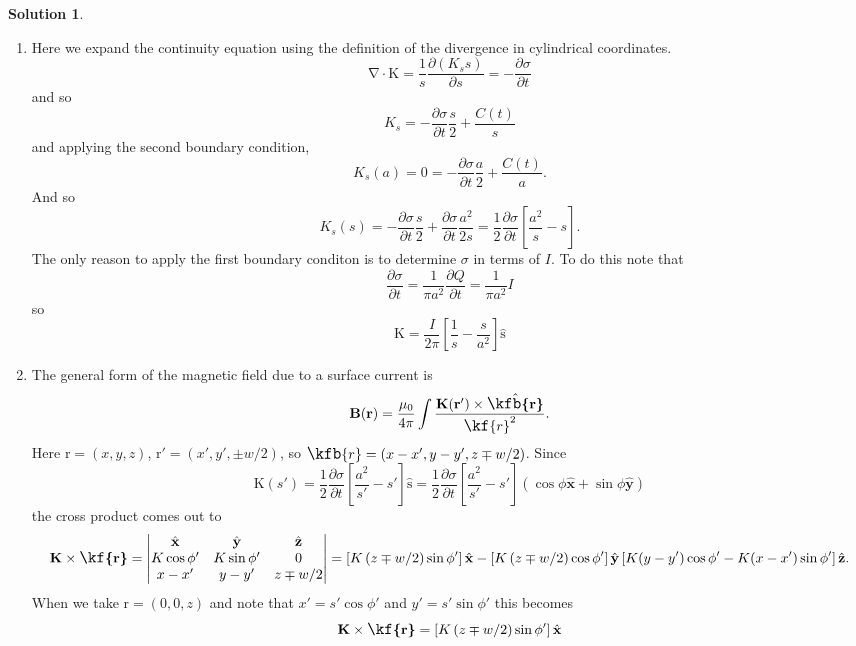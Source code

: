 \documentclass[10pt]{article}
\theoremstyle{definition}
\newtheorem{soln}{Solution}
\newcommand{\ux}{\hat{\mathbf{x}}}
\newcommand{\uy}{\hat{\mathbf{y}}}
\newcommand{\uz}{\hat{\mathbf{z}}}
\newcommand{\uv}[1]{\hat{\bv{{#1}}}}
\renewcommand{\div}[1]{\bv{\nabla}\cdot #1}
\newcommand{\scriptr}{\fontsize{12pt}{12pt}\kf{r}\fontsize{10pt}{10pt}}
\newcommand{\bscriptr}{\fontsize{12pt}{12pt}\kfb{r}\fontsize{10pt}{10pt}}
\newcommand{\bv}[1]{\bm{\mathrm{#1}}}
\begin{document}
\begin{soln}~
  \begin{enumerate}[label=(\alph*)]
    \item Here we expand the continuity equation using the definition of the divergence in cylindrical coordinates.
          $$\div{\bv{K}}=\frac{1}{s}\frac{\partial (K_ss)}{\partial s}=-\frac{\partial \sigma}{\partial t}$$
          and so
          $$K_s=-\frac{\partial \sigma}{\partial t}\frac{s}{2}+\frac{C(t)}{s}$$
          and applying the second boundary condition,
          $$K_s(a)=0=-\frac{\partial \sigma}{\partial t}\frac{a}{2}+\frac{C(t)}{a}.$$
          And so
          $$K_s(s)=-\frac{\partial \sigma}{\partial t}\frac{s}{2}+\frac{\partial \sigma}{\partial t}\frac{a^2}{2s}=\frac{1}{2}\frac{\partial \sigma}{\partial t}\left[\frac{a^2}{s}-s\right].$$
          The only reason to apply the first boundary conditon is to determine $\sigma$ in terms of $I$. To do this note that
          $$\frac{\partial \sigma}{\partial t}=\frac{1}{\pi a^2}\frac{\partial Q}{\partial t}=\frac{1}{\pi a^2}I$$
          so
          $$\bv{K}=\frac{I}{2\pi}\left[\frac{1}{s}-\frac{s}{a^2}\right]\uv{s}$$
    \item The general form of the magnetic field due to a surface current is
          $$\bv{B}(\bv{r})=\frac{\mu_0}{4\pi}\int \frac{\bv{K}(\bv{r}')\times \uv{\bscriptr}}{\scriptr^2}.$$
          Here
          $\bv{r}=(x,y,z)$, $\bv{r}'=(x',y',\pm w/2)$, so $\bscriptr=(x-x',y-y', z\mp w/2)$. Since
          $$\bv{K}(s')=\frac{1}{2}\frac{\partial \sigma}{\partial t}\left[\frac{a^2}{s'}-s'\right]\uv{s}=\frac{1}{2}\frac{\partial \sigma}{\partial t}\left[\frac{a^2}{s'}-s'\right]\left(\cos\phi\ux+\sin\phi\uy\right)$$
          the cross product comes out to
          $$
            \bv{K}\times \bv{\scriptr}
            =\begin{vmatrix}
              \ux        & \uy        & \uz      \\
              K\cos\phi' & K\sin\phi' & 0        \\
              x-x'       & y-y'       & z\mp w/2
            \end{vmatrix}=
            \left[K\left(z\mp w/2\right)\sin\phi'\right]\ux
            -\left[K\left(z\mp w/2\right)\cos\phi'\right]\uy
            \left[K(y-y')\cos\phi'-K(x-x')\sin\phi'\right]\uz.
          $$
          When we take $\bv{r}=(0,0,z)$ and note that $x'=s'\cos\phi'$ and $y'=s'\sin\phi'$ this becomes
          $$
            \bv{K}\times \bv{\scriptr}
            =
            \left[K\left(z\mp w/2\right)\sin\phi'\right]\ux
$$
\end{enumerate}
\end{soln}
\end{document}
